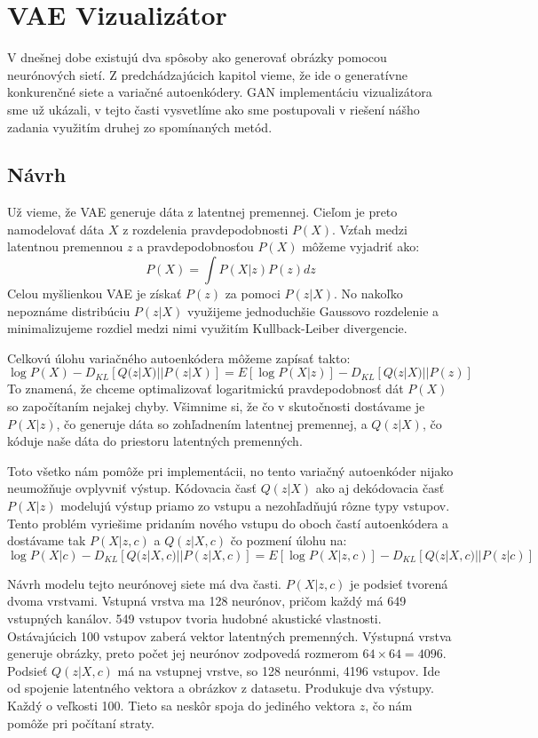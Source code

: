 \chapter{VAE Vizualizátor}
\label{vae}

V dnešnej dobe existujú dva spôsoby ako generovať obrázky pomocou neurónových sietí.
Z predchádzajúcich kapitol vieme, že ide o generatívne konkurenčné siete a variačné autoenkódery.
GAN implementáciu vizualizátora sme už ukázali, v tejto časti vysvetlíme ako sme postupovali v riešení nášho zadania využitím druhej zo spomínaných metód.

\section{Návrh}
Už vieme, že VAE generuje dáta z latentnej premennej.
Cieľom je preto namodelovať dáta \(X\) z rozdelenia pravdepodobnosti \(P(X)\).
Vzťah medzi latentnou premennou \(z\) a pravdepodobnosťou \(P(X)\) môžeme vyjadriť ako: \[P(X) = \int P(X|z)P(z)dz\]
Celou myšlienkou VAE je získať \(P(z)\) za pomoci \(P(z|X)\).
No nakoľko nepoznáme distribúciu \(P(z|X)\) využijeme jednoduchšie Gaussovo rozdelenie a minimalizujeme rozdiel medzi nimi využitím Kullback-Leiber divergencie.

Celkovú úlohu variačného autoenkódera môžeme zapísať takto: \[\log P(X) - D_{KL}[Q(z|X)||P(z|X)] = E[\log P(X|z)] - D_{KL} [Q(z|X)||P(z)]\]
To znamená, že chceme optimalizovať logaritmickú pravdepodobnosť dát \(P(X)\) so započítaním nejakej chyby.
Všimnime si, že čo v skutočnosti dostávame je \(P(X|z)\), čo generuje dáta so zohľadnením latentnej premennej, a \(Q(z|X)\), čo kóduje naše dáta do priestoru latentných premenných.

Toto všetko nám pomôže pri implementácii, no tento variačný autoenkóder nijako neumožňuje ovplyvniť výstup.
Kódovacia časť \(Q(z|X)\) ako aj dekódovacia časť \(P(X|z)\) modelujú výstup priamo zo vstupu a nezohľadňujú rôzne typy vstupov.
Tento problém vyriešime pridaním nového vstupu do oboch častí autoenkódera a dostávame tak \(P(X|z,c)\) a \(Q(z|X,c)\) čo pozmení úlohu na:
\[\log P(X|c) - D_{KL}[Q(z|X,c)||P(z|X,c)] = E[\log P(X|z,c)] - D_{KL} [Q(z|X,c)||P(z|c)]\]

Návrh modelu tejto neurónovej siete má dva časti.
\(P(X|z,c)\) je podsieť tvorená dvoma vrstvami.
Vstupná vrstva ma 128 neurónov, pričom každý má 649 vstupných kanálov.
549 vstupov tvoria hudobné akustické vlastnosti.
Ostávajúcich 100 vstupov zaberá vektor latentných premenných.
Výstupná vrstva generuje obrázky, preto počet jej neurónov zodpovedá rozmerom \(64\times64 = 4096\).
Podsieť \(Q(z|X,c)\) má na vstupnej vrstve, so 128 neurónmi, 4196 vstupov.
Ide od spojenie latentného vektora a obrázkov z datasetu.
Produkuje dva výstupy.
Každý o veľkosti 100.
Tieto sa neskôr spoja do jediného vektora \(z\), čo nám pomôže pri počítaní straty.

